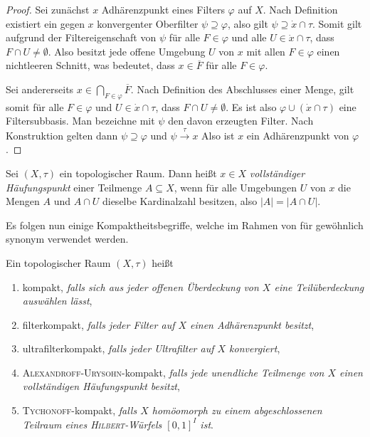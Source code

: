 \begin{proof}
  Sei zunächst $x$ Adhärenzpunkt eines Filters $\varphi$ auf $X$.
  Nach Definition existiert ein gegen $x$ konvergenter Oberfilter $\psi \supseteq \varphi$, also gilt $\psi \supseteq \dot x \cap \tau$.
  Somit gilt aufgrund der Filtereigenschaft von $\psi$ für alle $F \in \varphi$ und alle $U \in \dot x \cap \tau$, dass  $F \cap U \neq \emptyset$.
  Also besitzt jede offene Umgebung $U$ von $x$ mit allen $F \in \varphi$ einen nichtleeren Schnitt, was bedeutet, dass $x \in \overline F$ für alle $F  \in \varphi$.

  Sei andererseits $x \in \bigcap_{F \in \varphi} \overline F$.
  Nach Definition des Abschlusses einer Menge, gilt somit für alle $F \in \varphi$ und $U \in \dot x \cap \tau$, dass $F \cap U \neq \emptyset$.
  Es ist also $\varphi \cup (\dot x \cap \tau)$ eine Filtersubbasis.
  Man bezeichne mit $\psi$ den davon erzeugten Filter.
  Nach Konstruktion gelten dann $ \psi \supseteq \varphi $ und $ \psi \overset{\tau}{\to} x$
  Also ist $x$ ein Adhärenzpunkt von $\varphi$.
\end{proof}

\begin{defn}
  Sei $(X,\tau)$ ein topologischer Raum.
  Dann heißt $x \in X$ \textit{vollständiger Häufungspunkt} einer Teilmenge $A \subseteq X$, wenn für alle Umgebungen $U$ von $x$ die Mengen $A$ und $A \cap U$ dieselbe Kardinalzahl besitzen, also $|A| = | A \cap U |$.
\end{defn}

Es folgen nun einige Kompaktheitsbegriffe, welche im Rahmen von \ZFC für gewöhnlich synonym verwendet werden.
\begin{defn}
  \label{def:compactness}
  Ein topologischer Raum $(X,\tau)$ heißt
  \begin{enumerate}[(1)]
    \item kompakt, \textit{falls sich aus jeder offenen Überdeckung von $X$ eine Teilüberdeckung auswählen lässt},
    \item filterkompakt, \textit{falls jeder Filter auf $X$ einen Adhärenzpunkt besitzt},
    \item ultrafilterkompakt, \textit{falls jeder Ultrafilter auf $X$ konvergiert},
    \item \textsc{Alexandroff}-\textsc{Urysohn}-kompakt, \textit{falls jede unendliche Teilmenge von $X$ einen vollständigen Häufungspunkt besitzt},
    \item \textsc{Tychonoff}-kompakt, \textit{falls $X$ homöomorph zu einem abgeschlossenen Teilraum eines \textsc{Hilbert}-Würfels $[0,1]^I$ ist}.
  \end{enumerate}
\end{defn}

